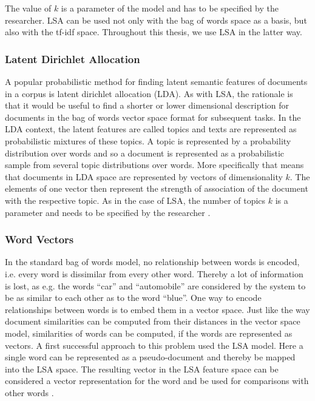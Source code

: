 The value of $k$ is a parameter of the model and has to be specified
by the researcher. LSA can be used not only with the bag of words space as a basis, but also with the tf-idf space. Throughout this thesis, we use LSA in the latter way.


\subsubsection*{Latent Dirichlet Allocation}

A popular probabilistic method for finding latent semantic features
of documents in a corpus is latent dirichlet allocation (LDA). As
with LSA, the rationale is that it would be useful to find a shorter
or lower dimensional description for documents in the bag of words
vector space format for subsequent tasks. In the LDA context, the latent
features are called topics and texts are represented as probabilistic
mixtures of these topics. A topic is represented by a probability
distribution over words and so a document is represented as a probabilistic
sample from several topic distributions over words. More specifically that means that documents in LDA space are represented by vectors of dimensionality $k$. The elements of one vector then represent the strength of association of the document with the respective topic. As in the case of LSA, the
number of topics $k$ is a parameter and needs to be specified by
the researcher \citep{Blei2003}. 


\subsubsection*{Word Vectors}

In the standard bag of words model, no relationship between words is
encoded, i.e. every word is dissimilar from every other word. Thereby
a lot of information is lost, as e.g. the words ``car'' and ``automobile''
are considered by the system to be as similar to each other as to
the word ``blue''. One way to encode relationships between words
is to embed them in a vector space. Just like the way document similarities
can be computed from their distances in the vector space model, similarities
of words can be computed, if the words are represented as vectors.
A first successful approach to this problem used the LSA model. Here
a single word can be represented as a pseudo-document and thereby
be mapped into the LSA space. The resulting vector in the LSA feature
space can be considered a vector representation for the word and be
used for comparisons with other words \citep{Deerwester1990}.


